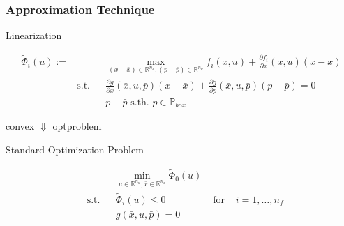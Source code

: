 \begin{frame}
	\frametitle{Approximation Technique}

\begin{block}{Linearization}
	
	\begin{align*}
	\tilde{\Phi}_{i}(u):= &&& \max_{(x-\bar{x})\in\mathbb{R}^{n_{x}}, (p-\bar{p})\in\mathbb{R}^{n_{p}}} f_{i}(\bar{x}, u)+\frac{\partial f_{i}}{\partial x}(\bar{x}, u)(x-\bar{x}) \\
	& \text{s.t.} && \frac{\partial g}{\partial x}(\bar{x}, u, \bar{p})(x-\bar{x})+\frac{\partial g}{\partial p}(\bar{x}, u, \bar{p})(p-\bar{p})=0 \\
	&&& p-\bar{p} \text{ s.th. } p\in\mathbb{P}_{box}
	\end{align*}
	
\end{block}	
	

\begin{center}
convex \textbf{$\Downarrow$} optproblem
\end{center}
	
\begin{block}{Standard Optimization Problem}	

\begin{align*}
&&&\min_{u\in\mathbb{R}^{n_{u}}, \bar{x}\in\mathbb{R}^{n_{x}}} \tilde{\Phi}_{0}(u)\\
&\text{s.t.} &&  \tilde{\Phi}_{i}(u)\leq 0 & \text{ for } & i=1,\ldots,n_{f}\\
&&& g(\bar{x}, u, \bar{p})=0
\end{align*}
\end{block} 
	

\end{frame}
